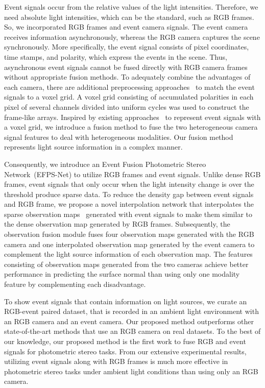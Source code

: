 Event signals occur from the relative values of the light intensities. Therefore, we need absolute light intensities, which can be the standard, such as RGB frames. So, we incorporated RGB frames and event camera signals. The event camera receives information asynchronously, whereas the RGB camera captures the scene synchronously. More specifically, the event signal consists of pixel coordinates, time stamps, and polarity, which express the events in the scene. Thus, asynchronous event signals cannot be fused directly with RGB camera frames without appropriate fusion methods. To adequately combine the advantages of each camera, there are additional preprocessing approaches~\citep{rebecq2017real,innocenti2021temporal,gehrig2019end} to match the event signals to a voxel grid. A voxel grid consisting of accumulated polarities in each pixel of several channels divided into uniform cycles was used to construct the frame-like arrays. Inspired by existing approaches~\citep{rebecq2017real,innocenti2021temporal,gehrig2019end} to represent event signals with a voxel grid, we introduce a fusion method to fuse the two heterogeneous camera signal features to deal with heterogeneous modalities. Our fusion method represents light source information in a complex manner.

Consequently, we introduce an Event Fusion Photometric Stereo Network~(EFPS-Net) to utilize RGB frames and event signals. Unlike dense RGB frames, event signals that only occur when the light intensity change is over the threshold produce sparse data. To reduce the density gap between event signals and RGB frame, we propose a novel interpolation network that interpolates the sparse observation maps~\citep{ikehata2018cnn} generated with event signals to make them similar to the dense observation map generated by RGB frames. Subsequently, the observation fusion module fuses four observation maps generated with the RGB camera and one interpolated observation map generated by the event camera to complement the light source information of each observation map. The features consisting of observation maps generated from the two cameras achieve better performance in predicting the surface normal than using only one modality feature by complementing each disadvantage.

To show event signals that contain information on light sources, we curate an RGB-event paired dataset, that is recorded in an ambient light environment with an RGB camera and an event camera. Our proposed method outperforms other state-of-the-art methods that use an RGB camera on real datasets. To the best of our knowledge, our proposed method is the first work to fuse RGB and event signals for photometric stereo tasks. From our extensive experimental results, utilizing event signals along with RGB frames is much more effective in photometric stereo tasks under ambient light conditions than using only an RGB camera.


